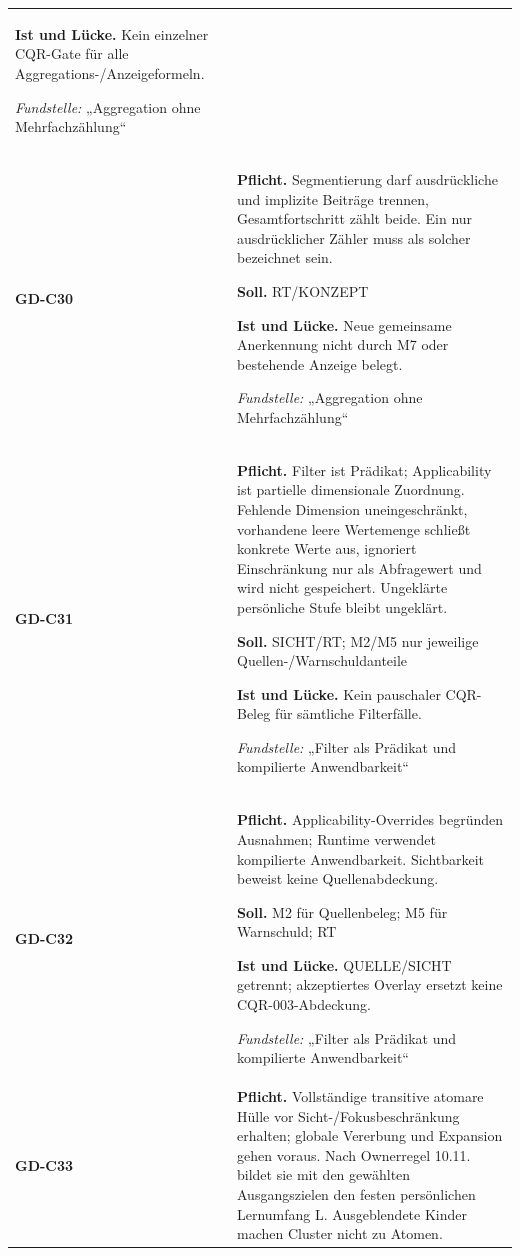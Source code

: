 \begin{longtable}{@{}P{20mm}P{128mm}@{}}
\textbf{Ist und Lücke.} Kein einzelner CQR-Gate für alle Aggregations-/Anzeigeformeln.\par\smallskip
\emph{Fundstelle:} „Aggregation ohne Mehrfachzählung“\\\addlinespace[5pt]
\label{rule:GD-C30}\textbf{GD-C30} &
\textbf{Pflicht.} Segmentierung darf ausdrückliche und implizite Beiträge trennen, Gesamtfortschritt zählt beide. Ein nur ausdrücklicher Zähler muss als solcher bezeichnet sein.\par\smallskip
\textbf{Soll.} RT/KONZEPT\par\smallskip
\textbf{Ist und Lücke.} Neue gemeinsame Anerkennung nicht durch M7 oder bestehende Anzeige belegt.\par\smallskip
\emph{Fundstelle:} „Aggregation ohne Mehrfachzählung“\\\addlinespace[5pt]
\label{rule:GD-C31}\textbf{GD-C31} &
\textbf{Pflicht.} Filter ist Prädikat; Applicability ist partielle dimensionale Zuordnung. Fehlende Dimension uneingeschränkt, vorhandene leere Wertemenge schließt konkrete Werte aus,  ignoriert Einschränkung nur als Abfragewert und wird nicht gespeichert. Ungeklärte persönliche Stufe bleibt ungeklärt.\par\smallskip
\textbf{Soll.} SICHT/RT; M2/M5 nur jeweilige Quellen-/Warnschuldanteile\par\smallskip
\textbf{Ist und Lücke.} Kein pauschaler CQR-Beleg für sämtliche Filterfälle.\par\smallskip
\emph{Fundstelle:} „Filter als Prädikat und kompilierte Anwendbarkeit“\\\addlinespace[5pt]
\label{rule:GD-C32}\textbf{GD-C32} &
\textbf{Pflicht.} Applicability-Overrides begründen Ausnahmen; Runtime verwendet kompilierte Anwendbarkeit. Sichtbarkeit beweist keine Quellenabdeckung.\par\smallskip
\textbf{Soll.} M2 für Quellenbeleg; M5 für Warnschuld; RT\par\smallskip
\textbf{Ist und Lücke.} QUELLE/SICHT getrennt; akzeptiertes Overlay ersetzt keine CQR-003-Abdeckung.\par\smallskip
\emph{Fundstelle:} „Filter als Prädikat und kompilierte Anwendbarkeit“\\\addlinespace[5pt]
\label{rule:GD-C33}\textbf{GD-C33} &
\textbf{Pflicht.} Vollständige transitive atomare Hülle vor Sicht-/Fokusbeschränkung erhalten; globale Vererbung und Expansion gehen voraus. Nach Ownerregel 10.11. bildet sie mit den gewählten Ausgangszielen den festen persönlichen Lernumfang L. Ausgeblendete Kinder machen Cluster nicht zu Atomen.\par\smallskip

\end{longtable}
